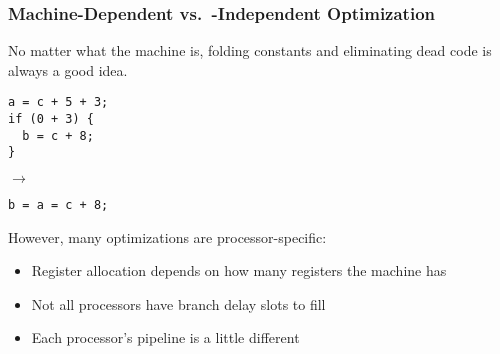 \documentclass{plt}
\begin{document}
\begin{frame}[fragile]
  \frametitle{Machine-Dependent vs.\ -Independent Optimization}

No matter what the machine is, folding constants and eliminating dead
code is always a good idea.

\begin{minipage}{0.35\textwidth}
\begin{verbatim}
a = c + 5 + 3;
if (0 + 3) {
  b = c + 8;
}
\end{verbatim}
\end{minipage}
$\rightarrow$\hspace{1pc}
\begin{minipage}{0.35\textwidth}
\begin{verbatim}
b = a = c + 8;
\end{verbatim}
\end{minipage}

However, many optimizations are processor-specific:

\begin{itemize}
\item Register allocation depends on how many registers the machine has

\item Not all processors have branch delay slots to fill

\item Each processor's pipeline is a little different
\end{itemize}

\end{frame}
\end{document}
